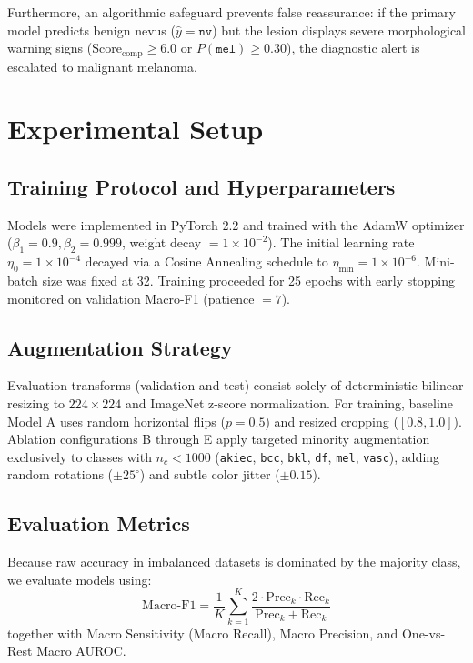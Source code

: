 \documentclass[conference]{IEEEtran}
\begin{document}
Furthermore, an algorithmic safeguard prevents false reassurance: if the primary model predicts benign nevus ($\hat{y} = \texttt{nv}$) but the lesion displays severe morphological warning signs ($\text{Score}_{\text{comp}} \ge 6.0$ or $P(\texttt{mel}) \ge 0.30$), the diagnostic alert is escalated to malignant melanoma.

\section{Experimental Setup}
\subsection{Training Protocol and Hyperparameters}
Models were implemented in PyTorch 2.2 and trained with the AdamW optimizer ($\beta_1=0.9, \beta_2=0.999$, weight decay $= 1 \times 10^{-2}$). The initial learning rate $\eta_0 = 1 \times 10^{-4}$ decayed via a Cosine Annealing schedule to $\eta_{\text{min}} = 1 \times 10^{-6}$. Mini-batch size was fixed at 32. Training proceeded for 25 epochs with early stopping monitored on validation Macro-F1 (patience $= 7$).

\subsection{Augmentation Strategy}
Evaluation transforms (validation and test) consist solely of deterministic bilinear resizing to $224 \times 224$ and ImageNet z-score normalization. For training, baseline Model A uses random horizontal flips ($p=0.5$) and resized cropping ($[0.8, 1.0]$). Ablation configurations B through E apply targeted minority augmentation exclusively to classes with $n_c < 1000$ (\texttt{akiec}, \texttt{bcc}, \texttt{bkl}, \texttt{df}, \texttt{mel}, \texttt{vasc}), adding random rotations ($\pm 25^\circ$) and subtle color jitter ($\pm 0.15$).

\subsection{Evaluation Metrics}
Because raw accuracy in imbalanced datasets is dominated by the majority class, we evaluate models using:
\begin{equation}
    \text{Macro-F1} = \frac{1}{K}\sum_{k=1}^K \frac{2 \cdot \text{Prec}_k \cdot \text{Rec}_k}{\text{Prec}_k + \text{Rec}_k}
\end{equation}
together with Macro Sensitivity (Macro Recall), Macro Precision, and One-vs-Rest Macro AUROC.
\end{document}
